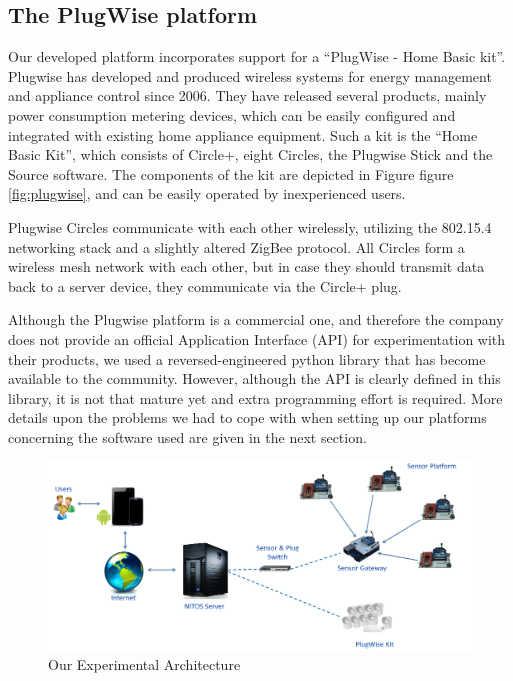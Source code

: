 \documentclass[conference]{IEEEtran}
\begin{document}
\subsection{The PlugWise platform}

Our developed platform incorporates support for a “PlugWise - Home Basic kit”. 
Plugwise has developed and produced wireless systems for energy management and appliance control since 2006. 
They have released several products, mainly power consumption metering devices, which can be easily configured and integrated with existing home appliance equipment.
Such a kit is the “Home Basic Kit”, which consists of Circle+, eight Circles, the Plugwise Stick and the Source software. 
The components of the kit are depicted in Figure figure \ref{fig:plugwise}, and can be easily operated by inexperienced users. 


Plugwise Circles communicate with each other wirelessly, utilizing the 802.15.4 networking stack and a slightly altered ZigBee protocol. 
All Circles form a wireless mesh network with each other, but in case they should transmit data back to a server device, they communicate via the Circle+ plug.

Although the Plugwise platform is a commercial one, and therefore the company does not provide an official Application Interface (API) for experimentation with their products, we used a reversed-engineered python library that has become available to the community. 
However, although the API is clearly defined in this library, it is not that mature yet and extra programming effort is required. 
More details upon the problems we had to cope with when setting up our platforms concerning the software used are given in the next section.



\begin{figure}[!t]
\begin{center}
\centering
\includegraphics[scale=0.15]{images/tsoukalas_arch.png}
\caption{Our Experimental Architecture}
\label{fig:network_arch}\end{center}
\vspace{-0.8cm}
\end{figure}
\end{document}
